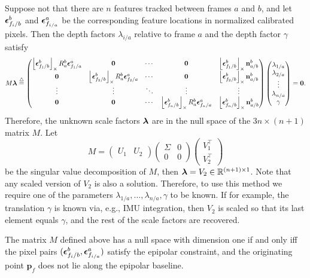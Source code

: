 	Suppose not that there are $n$ features tracked between frames $a$ and $b$, and let $\boldsymbol{\epsilon}_{f_i/b}^b$ and $\boldsymbol{\epsilon}_{f_{i/a}}^a$ be the corresponding feature locations in normalized calibrated pixels.  Then the depth factors $\lambda_{i/a}$ relative to frame $a$ and the depth factor $\gamma$ satisfy
	\[
	M\boldsymbol{\lambda} \stackrel{\triangle}{=} \begin{pmatrix}
 					  	\left\lfloor\boldsymbol{\epsilon}_{f_1/b}^b\right\rfloor_{\times} R_a^b \boldsymbol{\epsilon}_{f_1/a}^a & \mathbf{0} & \cdots & \mathbf{0} & \left\lfloor\boldsymbol{\epsilon}_{f_1/b}^b\right\rfloor_{\times} \mathbf{n}_{a/b}^b \\
 					  	\mathbf{0} & \left\lfloor\boldsymbol{\epsilon}_{f_2/b}^b\right\rfloor_{\times} R_a^b \boldsymbol{\epsilon}_{f_2/a}^a & \cdots & \mathbf{0} & \left\lfloor\boldsymbol{\epsilon}_{f_2/b}^b\right\rfloor_{\times} \mathbf{n}_{a/b}^b \\
 					  	\vdots & \vdots & \ddots & \vdots & \vdots \\
 					  	\mathbf{0} & \mathbf{0} & \cdots & \left\lfloor\boldsymbol{\epsilon}_{f_n/b}^b\right\rfloor_{\times} R_a^b \boldsymbol{\epsilon}_{f_n/a}^a & \left\lfloor\boldsymbol{\epsilon}_{f_n/b}^b\right\rfloor_{\times} \mathbf{n}_{a/b}^b
 					  \end{pmatrix}
 					  \begin{pmatrix} \lambda_{1/a} \\ \lambda_{2/a} \\ \vdots \\ \lambda_{n/a} \\ \gamma \end{pmatrix} = \mathbf{0}.
	\]
	Therefore, the unknown scale factors $\boldsymbol{\lambda}$ are in the null space of the $3n\times(n+1)$ matrix $M$.  Let
	\[
		M = \begin{pmatrix}U_1 & U_2 \end{pmatrix}\begin{pmatrix}\Sigma & 0 \\ 0 & 0 \end{pmatrix} \begin{pmatrix} V_1^\top \\ V_2^\top \end{pmatrix}
	\]
	be the singular value decomposition of $M$, then $\boldsymbol{\lambda} = V_2\in\mathbb{R}^{(n+1)\times 1}$.  Note that any scaled version of $V_2$ is also a solution.  Therefore, to use this method we require one of the parameters $\lambda_{1/a}, \dots, \lambda_{n/a}, \gamma$ to be known.  If for example, the translation $\gamma$ is known via, e.g., IMU integration, then $V_2$ is scaled so that its last element equals $\gamma$, and the rest of the scale factors are recovered.
		
	\begin{theorem}
		The matrix $M$ defined above has a null space with dimension one if and only iff the pixel pairs $(\boldsymbol{\epsilon}_{f_i/b}^b, \boldsymbol{\epsilon}_{f_{i/a}}^a)$ satisfy the epipolar constraint, and the originating point $\mathbf{p}_f$ does not lie along the epipolar baseline.
	\end{theorem}
	
